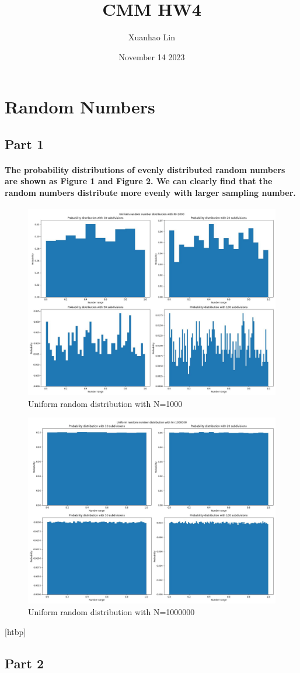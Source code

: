 \documentclass{article}
\title{CMM HW4}
\author{Xuanhao Lin}
\date{November 14 2023}
\begin{document}
\maketitle

\section{Random Numbers}
\subsection{Part 1}
\paragraph{
The probability distributions of evenly distributed random numbers are shown as Figure 1 and Figure 2. We can clearly find that the random numbers distribute more evenly with larger sampling number.
}
\begin{figure}[htbp]
    \centering
    \includegraphics[width=0.5\linewidth]{Part1_1_N=1000.jpeg}
    \caption{Uniform random distribution with N=1000}
\end{figure}
\begin{figure}[htbp]
    \centering
    \includegraphics[width=0.5\linewidth]{Part1_1_N=1000000.jpeg}
    \caption{Uniform random distribution with N=1000000}
\end{figure}[htbp]
\subsection{Part 2}
\end{document}
